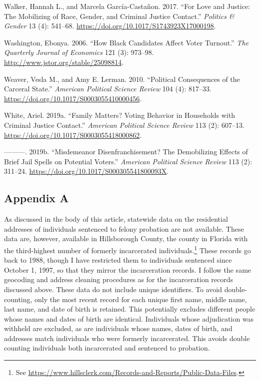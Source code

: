 \documentclass[
  12pt,
]{article}
\newlength{\cslhangindent}
\newenvironment{cslreferences}%
  {\setlength{\parindent}{0pt}%
  \everypar{\setlength{\hangindent}{\cslhangindent}}\ignorespaces}%
  {\par}
\begin{document}
\begin{cslreferences}
\leavevmode\hypertarget{ref-Walker2017}{}%
Walker, Hannah L., and Marcela García-Castañon. 2017. ``For Love and Justice: The Mobilizing of Race, Gender, and Criminal Justice Contact.'' \emph{Politics \& Gender} 13 (4): 541--68. \url{https://doi.org/10.1017/S1743923X17000198}.

\leavevmode\hypertarget{ref-Washington2006}{}%
Washington, Ebonya. 2006. ``How Black Candidates Affect Voter Turnout.'' \emph{The Quarterly Journal of Economics} 121 (3): 973--98. \url{http://www.jstor.org/stable/25098814}.

\leavevmode\hypertarget{ref-Weaver2010}{}%
Weaver, Vesla M., and Amy E. Lerman. 2010. ``Political Consequences of the Carceral State.'' \emph{American Political Science Review} 104 (4): 817--33. \url{https://doi.org/10.1017/S0003055410000456}.

\leavevmode\hypertarget{ref-White2019a}{}%
White, Ariel. 2019a. ``Family Matters? Voting Behavior in Households with Criminal Justice Contact.'' \emph{American Political Science Review} 113 (2): 607--13. \url{https://doi.org/10.1017/S0003055418000862}.

\leavevmode\hypertarget{ref-White2019}{}%
---------. 2019b. ``Misdemeanor Disenfranchisement? The Demobilizing Effects of Brief Jail Spells on Potential Voters.'' \emph{American Political Science Review} 113 (2): 311--24. \url{https://doi.org/10.1017/S000305541800093X}.
\end{cslreferences}

\newpage
{}

\hypertarget{appendix-a}{%
\subsection*{Appendix A}\label{appendix-a}}

As discussed in the body of this article, statewide data on the residential addresses of individuals sentenced to felony probation are not available. These data are, however, available in Hillsborough County, the county in Florida with the third-highest number of formerly incarcerated individuals.\footnote{See \url{https://www.hillsclerk.com/Records-and-Reports/Public-Data-Files}.} These records go back to 1988, though I have restricted them to individuals sentenced since October 1, 1997, so that they mirror the incarceration records. I follow the same geocoding and address cleaning procedures as for the incarceration records discussed above. These data do not include unique identifiers. To avoid double-counting, only the most recent record for each unique first name, middle name, last name, and date of birth is retained. This potentially excludes different people whose names and dates of birth are identical. Individuals whose adjudication was withheld are excluded, as are individuals whose names, dates of birth, and addresses match individuals who were formerly incarcerated. This avoids double counting individuals both incarcerated and sentenced to probation.
\end{document}
